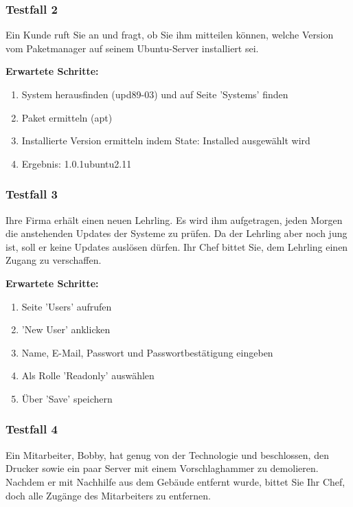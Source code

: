{\subsubsection*{Testfall 2}

Ein Kunde ruft Sie an und fragt, ob Sie ihm mitteilen können, welche Version vom Paketmanager auf seinem Ubuntu-Server installiert sei.

\bigskip
\textbf{Erwartete Schritte:}

\begin{enumerate}
    \item System herausfinden (upd89-03) und auf Seite 'Systems' finden
    \item Paket ermitteln (apt)
    \item Installierte Version ermitteln indem State: Installed ausgewählt wird
    \item Ergebnis: 1.0.1ubuntu2.11
\end{enumerate}


\subsubsection*{Testfall 3}

Ihre Firma erhält einen neuen Lehrling. Es wird ihm aufgetragen, jeden Morgen die anstehenden Updates der Systeme zu prüfen. Da der Lehrling aber noch jung ist, soll er keine Updates auslösen dürfen. Ihr Chef bittet Sie, dem Lehrling einen Zugang zu verschaffen.

\bigskip
\textbf{Erwartete Schritte:}

\begin{enumerate}
    \item Seite 'Users' aufrufen
    \item 'New User' anklicken
    \item Name, E-Mail, Passwort und Passwortbestätigung eingeben
    \item Als Rolle 'Readonly' auswählen
    \item Über 'Save' speichern
\end{enumerate}


\subsubsection*{Testfall 4}

Ein Mitarbeiter, Bobby, hat genug von der Technologie und beschlossen, den Drucker sowie ein paar Server mit einem Vorschlaghammer zu demolieren. Nachdem er mit Nachhilfe aus dem Gebäude entfernt wurde, bittet Sie Ihr Chef, doch alle Zugänge des Mitarbeiters zu entfernen.

}
